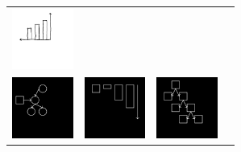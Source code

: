 \documentclass{article}
\newcommand{\exampleImageSize}{2cm}
\begin{document}
\begin{figure}[H]
\begin{minipage}[t]{0.7\linewidth}
\begin{tabular}{llll}
    \includegraphics[width = \exampleImageSize]{figures/expert-58.png}\\
  \includegraphics[width = \exampleImageSize]{figures/60.png}&
  \includegraphics[width = \exampleImageSize]{figures/5.png}&
    \includegraphics[width = \exampleImageSize]{figures/17.png}&

\end{tabular}
\end{minipage}
\end{figure}
\end{document}
